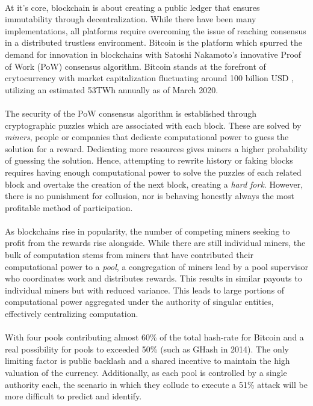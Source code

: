 \paragraph{} At it's core, blockchain is about creating a public ledger that ensures immutability through decentralization. While there have been many implementations, all platforms require overcoming the issue of reaching consensus in a distributed trustless environment. Bitcoin \cite{nakamoto2009} is the platform which spurred the demand for innovation in blockchains with Satoshi Nakamoto's innovative Proof of Work (PoW) consensus algorithm. Bitcoin stands at the forefront of crytocurrency with market capitalization fluctuating around 100 billion USD \cite{bitcoinmarketcap2020}, utilizing an estimated 53TWh annually \cite{cambridge2020} as of March 2020.

\paragraph{} The security of the PoW consensus algorithm is established through cryptographic puzzles which are associated with each block. These are solved by \textit{miners}, people or companies that dedicate computational power to guess the solution for a reward. Dedicating more resources gives miners a higher probability of guessing the solution. Hence, attempting to rewrite history or faking blocks requires having enough computational power to solve the puzzles of each related block and overtake the creation of the next block, creating a \textit{hard fork}. However, there is no punishment for collusion, nor is behaving honestly always the most profitable method of participation. 

\paragraph{} As blockchains rise in popularity, the number of competing miners seeking to profit from the rewards rise alongside. While there are still individual miners, the bulk of computation stems from miners that have contributed their computational power to a \textit{pool}, a congregation of miners lead by a pool supervisor who coordinates work and distributes rewards. This results in similar payouts to individual miners but with reduced variance. This leads to large portions of computational power aggregated under the authority of singular entities, effectively centralizing computation.

\paragraph{} With four pools contributing almost 60\% of the total hash-rate for Bitcoin \cite{bitcoinpools2020} and a real possibility for pools to exceeded 50\% (such as GHash in 2014). The only limiting factor is public backlash and a shared incentive to maintain the high valuation of the currency. Additionally, as each pool is controlled by a single authority each, the scenario in which they collude to execute a 51\% attack will be more difficult to predict and identify.

